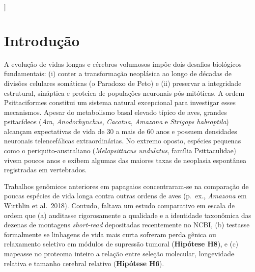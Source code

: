 \documentclass[10pt,a4paper,twocolumn]{article}
\begin{document}
{\begin{@twocolumnfalse}
\begin{abstract}
coordenadamente a subunidade de reparo de DNA \texttt{MAD2L2} (\texttt{REV7}, \#1 do genoma para tamanho cerebral), a chaperona de autofagia neuronal \texttt{HSPA8} (\texttt{HSC70}) e organizadores sinápticos/paliais (\texttt{SOX14}, \texttt{RTN1}, \texttt{NCALD}, \texttt{CBLN4}). Concluímos que a longevidade extrema e a expansão cerebral em papagaios compartilham uma arquitetura seletiva pleiotrópica baseada na blindagem de freios proliferativos e na otimização da proteostase neuronal e do reparo de DNA.\par\vspace{4pt}
    \noindent\textbf{Palavras-chave:} Psittaciformes $\cdot$ Paradoxo de Peto $\cdot$ Longevidade $\cdot$ Encefalização $\cdot$ Telômeros (\texttt{RTEL1}, \texttt{TERT}) $\cdot$ \texttt{PTEN} $\cdot$ \texttt{RERconverge}
    \end{abstract}
    \vspace{0.3cm}
  \end{@twocolumnfalse}
}]

\section{Introdução}

A evolução de vidas longas e cérebros volumosos impõe dois desafios biológicos fundamentais: (i) conter a transformação neoplásica ao longo de décadas de divisões celulares somáticas (o Paradoxo de Peto) e (ii) preservar a integridade estrutural, sináptica e proteica de populações neuronais pós-mitóticas. A ordem Psittaciformes constitui um sistema natural excepcional para investigar esses mecanismos. Apesar do metabolismo basal elevado típico de aves, grandes psitacídeos (\textit{Ara}, \textit{Anodorhynchus}, \textit{Cacatua}, \textit{Amazona} e \textit{Strigops habroptila}) alcançam expectativas de vida de 30 a mais de 60 anos e possuem densidades neuronais telencefálicas extraordinárias. No extremo oposto, espécies pequenas como o periquito-australiano (\textit{Melopsittacus undulatus}, família Psittaculidae) vivem poucos anos e exibem algumas das maiores taxas de neoplasia espontânea registradas em vertebrados.

Trabalhos genômicos anteriores em papagaios concentraram-se na comparação de poucas espécies de vida longa contra outras ordens de aves (p.\ ex., \textit{Amazona} em Wirthlin et al.\ 2018). Contudo, faltava um estudo comparativo em escala de ordem que (a) auditasse rigorosamente a qualidade e a identidade taxonômica das dezenas de montagens \textit{short-read} depositadas recentemente no NCBI, (b) testasse formalmente se linhagens de vida mais curta sofreram perda gênica ou relaxamento seletivo em módulos de supressão tumoral (\textbf{Hipótese H8}), e (c) mapeasse no proteoma inteiro a relação entre seleção molecular, longevidade relativa e tamanho cerebral relativo (\textbf{Hipótese H6}).
\end{document}
